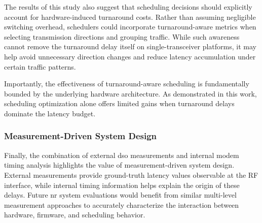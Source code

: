 \documentclass[conference]{IEEEtran}
\begin{document}
The results of this study also suggest that scheduling decisions should explicitly account for hardware-induced turnaround costs. Rather than assuming negligible switching overhead, schedulers could incorporate turnaround-aware metrics when selecting transmission directions and grouping traffic. While such awareness cannot remove the turnaround delay itself on single-transceiver platforms, it may help avoid unnecessary direction changes and reduce latency accumulation under certain traffic patterns.

Importantly, the effectiveness of turnaround-aware scheduling is fundamentally bounded by the underlying hardware architecture. As demonstrated in this work, scheduling optimization alone offers limited gains when turnaround delays dominate the latency budget.

\subsubsection{Measurement-Driven System Design}

Finally, the combination of external \gls{dso} measurements and internal modem timing analysis highlights the value of measurement-driven system design. External measurements provide ground-truth latency values observable at the RF interface, while internal timing information helps explain the origin of these delays. Future \gls{nr} system evaluations would benefit from similar multi-level measurement approaches to accurately characterize the interaction between hardware, firmware, and scheduling behavior. 


\end{document}
